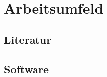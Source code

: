 \section{Arbeitsumfeld}
\label{sec:arbeitsumfeld}

  \subsection{Literatur}
  \label{ssec:literatur}
    \nocite{*}
    \printbibliography

  \subsection{Software}
  \label{ssec:software}
